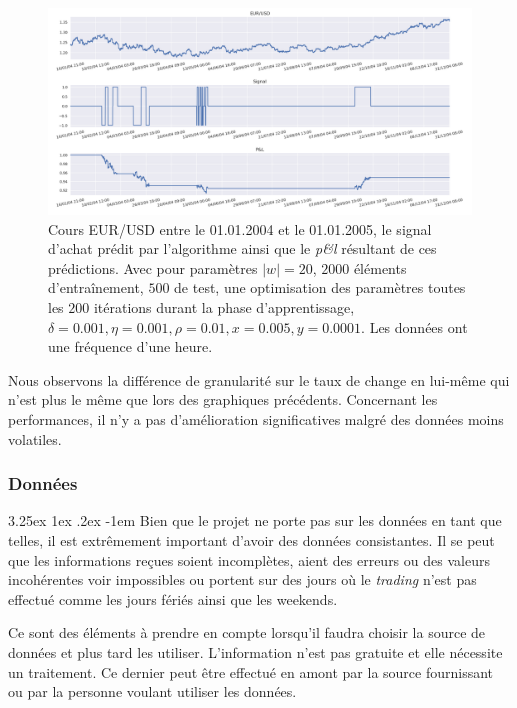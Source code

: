 \documentclass[a4paper, 11pt]{article}
\makeatletter
\renewcommand\paragraph{\@startsection{paragraph}{5}{\z@}%
  {3.25ex \@plus1ex \@minus.2ex}%
  {-1em}%
  {\normalfont\normalsize\bfseries}}
\makeatother
\begin{document}
\begin{figure}
	\centering
		\includegraphics[scale=0.5]{res/eursud_2004-2005-hours}
	\caption{Cours EUR/USD entre le 01.01.2004 et le 01.01.2005, le signal d'achat prédit par l'algorithme ainsi que le \textit{p\&l} résultant de ces prédictions. Avec pour paramètres $|w| = 20$, $2000$ éléments d'entraînement, $500$ de test, une optimisation des
		paramètres toutes les $200$ itérations durant la phase d'apprentissage, $\delta = 0.001, \eta=0.001,\rho=0.01, x = 0.005, y=0.0001$. Les données ont une fréquence d'une heure.}
	\label{eurusd 2004 2005 hours}
\end{figure}
\clearpage

Nous observons la différence de granularité sur le taux de change en lui-même qui n'est plus le même que lors des graphiques précédents. Concernant les performances, il n'y a pas d'amélioration significatives malgré des données moins volatiles.

\subsubsection{Données}

\paragraph{}
Bien que le projet ne porte pas sur les données en tant que telles, il est extrêmement important d'avoir des données consistantes. Il se peut que les informations reçues soient incomplètes, aient des erreurs ou des valeurs incohérentes voir impossibles ou portent sur des jours où le \textit{trading} n'est pas effectué comme les jours fériés ainsi que les weekends.

Ce sont des éléments à prendre en compte lorsqu'il faudra choisir la source de données et plus tard les utiliser. L'information n'est pas gratuite et elle nécessite un traitement. Ce dernier peut être effectué en amont par la source fournissant ou par la personne voulant utiliser les données.
\end{document}
